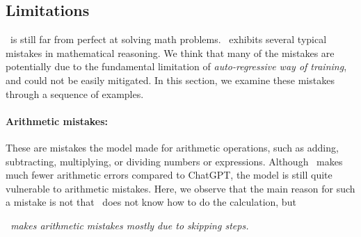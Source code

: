 \begin{comment}
\begin{tcolorbox}[colback=white!5!white, enhanced, attach boxed title to top center={yshift=-3mm}, title=ChatGPT]
\begin{verbatim}
Suppose X is a random variable that represents the value of sin(x). The probability distribution of X is such that P(X=0.88) = 0.2 and P(X=-0.88) = 0.2, and P(X=0) = 0.6. Let Y be a random variable that represents the value of sin(2x). Find the probability distribution of Y.
\end{verbatim}
\end{tcolorbox}

\begin{tcolorbox}[colback=white!5!white, enhanced, attach boxed title to top center={yshift=-3mm}, title=DV3]
\begin{verbatim}
Suppose X is a random variable that takes values in the interval [0, 2pi) with a uniform distribution. Let Y = sin(X) and Z = sin(2X). Find the probability that Z > 1.5 given that Y > 0.8
\end{verbatim}
\end{tcolorbox}
\end{figure}


\end{comment}


 
\subsection{Limitations}

\DV \ is still far from perfect at solving math problems. \DV \ exhibits several typical mistakes in mathematical reasoning. We think that many of the mistakes are potentially due to the fundamental limitation of \emph{auto-regressive way of training}, and could not be easily mitigated. In this section, we examine these mistakes through a sequence of examples.%

\paragraph{Arithmetic mistakes:} These are mistakes the model made for arithmetic operations, such as adding, subtracting, multiplying, or dividing numbers or expressions. Although \DV \ makes much fewer arithmetic errors compared to ChatGPT, the model is still quite vulnerable to arithmetic mistakes. Here, we observe that the main reason for such a mistake is not that \DV \ does not know how to do the calculation, but 
\begin{center}
\emph{\DV \ makes arithmetic mistakes mostly due to skipping steps.}
\end{center}

